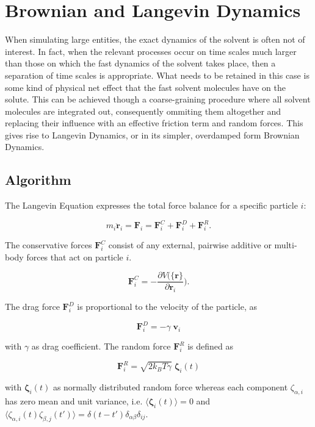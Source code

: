 \documentclass[8.5pt,twoside,twocolumn]{article}
\newcommand{\beq}{\begin{equation}}
\newcommand{\eeq}{\end{equation}}
\begin{document}
\section{Brownian and Langevin Dynamics}

When simulating large entities, the exact dynamics of the solvent is often not of interest.
In fact, when the relevant processes occur on time scales much larger than those on which the fast dynamics of 
the solvent takes place, then a separation of time scales is appropriate.
What needs to be retained in this case is some kind of physical net effect that the fast solvent molecules have
on the solute. This can be achieved though a coarse-graining procedure where all solvent molecules are integrated out,
consequently ommiting them altogether and replacing their influence with an effective friction term and random forces.
This gives rise to Langevin Dynamics, or in its simpler, overdamped form Brownian Dynamics. 

\subsection{Algorithm}

The Langevin Equation expresses the total force balance for a specific particle $i$:

\beq\label{LE}
m_i \ddot{{\mathbf{r}}}_i = \mathbf{F}_i = \mathbf{F}_i^C+ \mathbf{F}_{i}^D + \mathbf{F}_{i}^R.
\eeq

The conservative forces $\mathbf{F}_i^C$ consist of any external, pairwise additive or multi-body forces that act on 
particle $i$. 

\beq
\mathbf{F}_i^C = -\frac{\partial V (\{\mathbf{r}\}}{\partial\mathbf{r}_i}).
\eeq

The drag force $\mathbf{F}_{i}^D$ is proportional to the velocity of the particle, 
as 

\beq
\mathbf{F}_{i}^D =-\gamma\; \mathbf{v}_i
\eeq

with $\gamma$ as drag coefficient. The random force $\mathbf{F}_{i}^R$ is defined as 

\beq
\mathbf{F}_{i}^R = \sqrt{2 k_B T \gamma}\; \mathbf{\zeta}_i(t)
\eeq

with $\mathbf{\zeta}_i(t)$ as normally distributed random force whereas each component $\zeta_{\alpha, i}$ 
has zero mean and unit variance, i.e. $\langle \mathbf{\zeta}_i(t)\rangle =0$ 
and $\langle \zeta_{\alpha, i} (t) \zeta_{\beta, j}(t')\rangle = \delta(t-t')\delta_{\alpha \beta}\delta_{ij}$.
\end{document}
